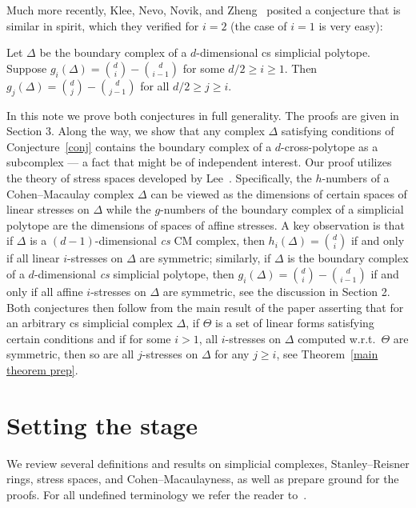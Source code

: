\documentclass[ALCO,ThmDefs,Unicode,epreuves]{cedram}
\begin{document}
Much more recently, Klee, Nevo, Novik, and Zheng~\cite[Conjecture 8.5]{KNNZ} posited a conjecture that is similar in spirit, which they verified for $i=2$ (the case of $i=1$ is very easy):
 \begin{conjecture}\label{conj2}
	Let $\Delta$ be the boundary complex of a $d$-dimensional cs simplicial polytope. Suppose $g_i(\Delta)=\binom{d}{i}-\binom{d}{i-1}$ for some $d/2\geq i\geq 1$. Then $g_j(\Delta)=\binom{d}{j}-\binom{d}{j-1}$ for all $d/2\geq j\geq i$.
\end{conjecture}

In this note we prove both conjectures in full generality. The proofs are given in Section 3. Along the way, we show that any complex $\Delta$ satisfying conditions of Conjecture~\ref{conj} contains the boundary complex of a $d$-cross-polytope as a subcomplex --- a fact that might be of independent interest. Our proof utilizes the theory of stress spaces developed by Lee~\cite{Lee96}. Specifically, the $h$-numbers of a Cohen--Macaulay complex $\Delta$ can be viewed as the dimensions of certain spaces of linear stresses on $\Delta$ while the $g$-numbers of the boundary complex of a simplicial polytope are the dimensions of spaces of affine stresses. A key observation is that if $\Delta$ is a $(d-1)$-dimensional \emph{cs} CM complex, then $h_i(\Delta)=\binom{d}{i}$ if and only if all linear $i$-stresses on $\Delta$ are symmetric; similarly, if $\Delta$ is the boundary complex of a $d$-dimensional \emph{cs} simplicial polytope, then $g_i(\Delta)=\binom{d}{i}-\binom{d}{i-1}$ if and only if all affine $i$-stresses on $\Delta$ are symmetric, see the discussion in Section 2. Both conjectures then follow from the main result of the paper asserting that for an arbitrary cs simplicial complex $\Delta$, if $\Theta$ is a set of linear forms satisfying certain conditions and if for some $i>1$, all $i$-stresses on $\Delta$ computed w.r.t.~$\Theta$ are symmetric, then so are all $j$-stresses on $\Delta$ for any $j\geq i$, see Theorem~\ref{main theorem prep}.



\section{Setting the stage}
We review several definitions and results on simplicial complexes, Stanley--Reisner rings, stress spaces, and Cohen--Macaulayness, as well as prepare ground for the proofs. For all undefined terminology we refer the reader to~\cite{Lee96, Stanley96}.
\end{document}
